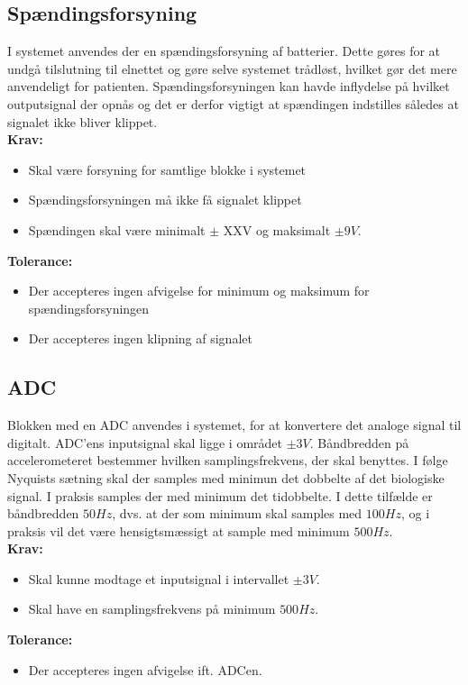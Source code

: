 \subsection{Spændingsforsyning}
I systemet anvendes der en spændingsforsyning af batterier. Dette gøres for at undgå tilslutning til elnettet og gøre selve systemet trådløst, hvilket gør det mere anvendeligt for patienten. Spændingsforsyningen kan havde inflydelse på hvilket outputsignal der opnås og det er derfor vigtigt at spændingen indstilles således at signalet ikke bliver klippet. \\
\noindent\textbf{Krav:}
\begin{itemize}
\item Skal være forsyning for samtlige blokke i systemet
\item Spændingsforsyningen må ikke få signalet klippet
\item Spændingen skal være minimalt $\pm$ XXV  og maksimalt $\pm9V$.
\end{itemize}
\noindent\textbf{Tolerance:}
\begin{itemize}
\item Der accepteres ingen afvigelse for minimum og maksimum for spændingsforsyningen
\item Der accepteres ingen klipning af signalet
\end{itemize}

\subsection{ADC}
Blokken med en ADC anvendes i systemet, for at konvertere det analoge signal til digitalt. %
ADC'ens inputsignal skal ligge i området $\pm3V$. Båndbredden på accelerometeret bestemmer hvilken samplingsfrekvens, der skal benyttes. I følge Nyquists sætning skal der samples med minimun det dobbelte af det biologiske signal. I praksis samples der med minimum det tidobbelte. I dette tilfælde er båndbredden $50Hz$, dvs. at der som minimum skal samples med $100Hz$, og i praksis vil det være hensigtsmæssigt at sample med minimum $500Hz$. \\
\textbf{Krav:}
\begin{itemize}
	\item Skal kunne modtage et inputsignal i intervallet $\pm 3 V$.
	\item Skal have en samplingsfrekvens på minimum $500Hz$.
\end{itemize}
\textbf{Tolerance:}
\begin{itemize}
	\item Der accepteres ingen afvigelse ift. ADCen.
\end{itemize}
